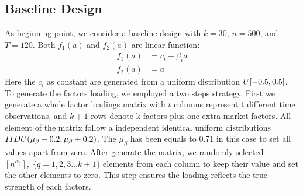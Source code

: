 \documentclass[12pt]{article}
\begin{document}
\subsection{Baseline Design}\label{base}
As beginning point, we consider a baseline design with $k = 30$, $n = 500$, and $T = 120$.
Both $f_1(a)$ and $f_2(a)$ are linear function:
\begin{align*}
f_1(a ) &= c_{i} +\beta_i a\\
f_2(a) &=a
\end{align*}
Here the $c_i$ as constant are generated from a uniform distribution $\mathnormal{U}[-0.5, 0.5]$.
To generate the factors loading, we employed a two steps strategy.
First we generate a whole factor loadings matrix with $t$ columns represent t different time observations, and $k+1$ rows denote k factors plus one extra market factors. 
All element of the matrix follow a independent identical uniform distributions $\mathnormal{IIDU}(\mu_{\beta} -0.2, \mu_{\beta} + 0.2)$. 
The $\mu_{\beta}$ has been equals to 0.71 in this case to set all values apart from zero. 
After generate the matrix, we randomly selected $[n^{\alpha_{q}}],\; \{q = 1, 2, 3\dots k+1\}$ elements from each column to keep their value  and set the other elements to zero. 
This step ensures the loading reflects the true strength of each factors. 


	
	 
	


\newpage


\end{document}
